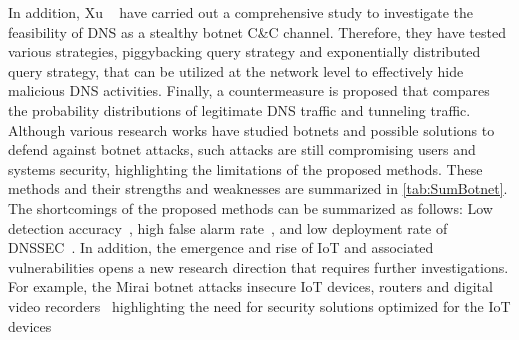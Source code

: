 In addition, Xu \etal~ have carried out a comprehensive study to investigate the feasibility of DNS as a stealthy botnet C\&C channel.  Therefore, they have tested various strategies, \eg piggybacking query strategy and exponentially distributed query strategy, that can be utilized at the network level to effectively hide malicious DNS activities. Finally, a countermeasure is proposed that compares the probability distributions of legitimate DNS traffic and tunneling traffic. 
 Although various research works have studied botnets and possible solutions to defend against botnet attacks, such attacks are still compromising users and systems security, highlighting the limitations of the proposed methods. These methods and their strengths and weaknesses are summarized in  \autoref{tab:SumBotnet}. The shortcomings of the proposed methods can be summarized as follows: Low detection accuracy~, high false alarm rate~, and low deployment rate of DNSSEC~. In addition, the emergence and rise of IoT and associated vulnerabilities opens a new research direction that requires further investigations. For example, the Mirai botnet attacks insecure IoT devices, \eg routers and digital video recorders~ highlighting the need for security solutions optimized for the IoT devices~

